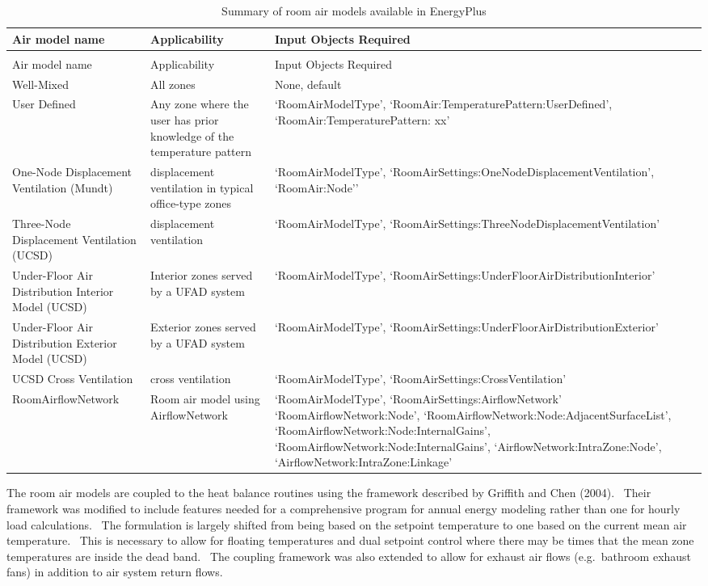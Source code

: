 \begin{longtable}[c]{p{1.5in}p{1.5in}p{3.0in}}
\caption{Summary of room air models available in EnergyPlus \label{table:summary-of-room-air-models-available-in}} \tabularnewline
\toprule 
Air model name & Applicability & Input Objects Required \tabularnewline
\midrule
\endfirsthead

\caption[]{Summary of room air models available in EnergyPlus} \tabularnewline
\toprule 
Air model name & Applicability & Input Objects Required \tabularnewline
\midrule
\endhead

Well-Mixed & All zones & None, default \tabularnewline
User Defined & Any zone where the user has prior knowledge of the temperature pattern & ‘RoomAirModelType’, ‘RoomAir:TemperaturePattern:UserDefined’, ‘RoomAir:TemperaturePattern: xx’ \tabularnewline
One-Node Displacement Ventilation (Mundt) & displacement ventilation in typical office-type zones & ‘RoomAirModelType’, ‘RoomAirSettings:OneNodeDisplacementVentilation’, ‘RoomAir:Node’’ \tabularnewline
Three-Node Displacement Ventilation (UCSD) & displacement ventilation & ‘RoomAirModelType’, ‘RoomAirSettings:ThreeNodeDisplacementVentilation’ \tabularnewline
Under-Floor Air Distribution Interior Model (UCSD) & Interior zones served by a UFAD system & ‘RoomAirModelType’, ‘RoomAirSettings:UnderFloorAirDistributionInterior’ \tabularnewline
Under-Floor Air Distribution Exterior Model (UCSD) & Exterior zones served by a UFAD system & ‘RoomAirModelType’, ‘RoomAirSettings:UnderFloorAirDistributionExterior’ \tabularnewline
UCSD Cross Ventilation & cross ventilation & ‘RoomAirModelType’, ‘RoomAirSettings:CrossVentilation’ \tabularnewline
RoomAirflowNetwork & Room air model using AirflowNetwork & ‘RoomAirModelType’, ‘RoomAirSettings:AirflowNetwork’ ‘RoomAirflowNetwork:Node’, ‘RoomAirflowNetwork:Node:AdjacentSurfaceList’, ‘RoomAirflowNetwork:Node:InternalGains’, ‘RoomAirflowNetwork:Node:InternalGains’, ‘AirflowNetwork:IntraZone:Node’, ‘AirflowNetwork:IntraZone:Linkage’ \tabularnewline
\bottomrule
\end{longtable}

The room air models are coupled to the heat balance routines using the framework described by Griffith and Chen (2004).~ Their framework was modified to include features needed for a comprehensive program for annual energy modeling rather than one for hourly load calculations.~ The formulation is largely shifted from being based on the setpoint temperature to one based on the current mean air temperature.~ This is necessary to allow for floating temperatures and dual setpoint control where there may be times that the mean zone temperatures are inside the dead band.~ The coupling framework was also extended to allow for exhaust air flows (e.g.~bathroom exhaust fans) in addition to air system return flows.

